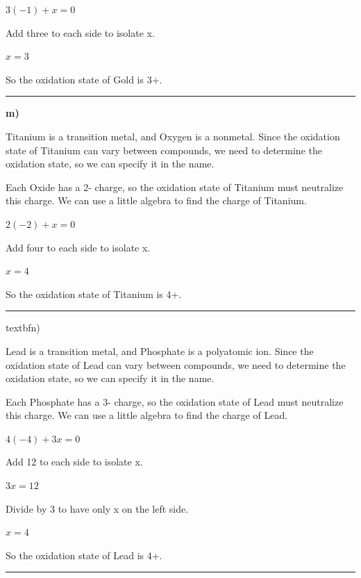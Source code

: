 \documentclass[12pt, oneside, letterpaper]{book}
\begin{document}
$3(-1) + x = 0$

Add three to each side to isolate x. 

$x = 3$ 

So the oxidation state of Gold is 3+. 



\hrule

\textbf{m) }

Titanium is a transition metal, and Oxygen is a nonmetal. Since the oxidation state of Titanium can vary between compounds, we need to determine the oxidation state, so we can specify it in the name. 

Each Oxide has a 2- charge, so the oxidation state of Titanium must neutralize this charge. We can use a little algebra to find the charge of Titanium. 

$2(-2) + x = 0$

Add four to each side to isolate x. 

$x = 4$ 

So the oxidation state of Titanium is 4+. 



\hrule


textbf{n) }

Lead is a transition metal, and Phosphate is a polyatomic ion. Since the oxidation state of Lead can vary between compounds, we need to determine the oxidation state, so we can specify it in the name. 

Each Phosphate has a 3- charge, so the oxidation state of Lead must neutralize this charge. We can use a little algebra to find the charge of Lead. 

$4(-4) + 3x = 0$

Add 12 to each side to isolate x. 

$3x = 12$ 

Divide by 3 to have only x on the left side.

$x=4$ 

So the oxidation state of Lead is 4+. 


\hrule
\end{document}

